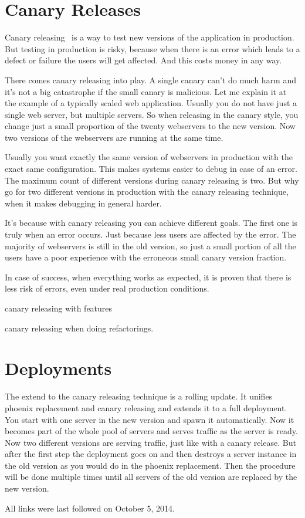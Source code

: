 \documentclass[runningheads,a4paper]{llncs}
\begin{document}
\section{Canary Releases}

Canary releasing~\cite[find page]{continuous_delivery} is a way to test new versions of the application in production. But testing in production is risky, because when there is an error which leads to a defect or failure the users will get affected. And this costs money in any way.

There comes canary releasing into play. A single canary can't do much harm and it's not a big catastrophe if the small canary is malicious. Let me explain it at the example of a typically scaled web application. Usually you do not have just a single web server, but multiple servers. So when releasing in the canary style, you change just a small proportion of the twenty webservers to the new version. Now two versions of the webservers are running at the same time.

Usually you want exactly the same version of webservers in production with the exact same configuration. This makes systems easier to debug in case of an error. The maximum count of different versions during canary releasing is two. But why go for two different versions in production with the canary releasing technique, when it makes debugging in general harder.

It's because with canary releasing you can achieve different goals. The first one is truly when an error occurs. Just because less users are affected by the error. The majority of webservers is still in the old version, so just a small portion of all the users have a poor experience with the erroneous small canary version fraction.

In case of success, when everything works as expected, it is proven that there is less risk of errors, even under real production conditions.

canary releasing with features

canary releasing when doing refactorings.

\section{Deployments}

The extend to the canary releasing technique is a rolling update. It unifies phoenix replacement and canary releasing and extends it to a full deployment. You start with one server in the new version and spawn it automatically. Now it becomes part of the whole pool of servers and serves traffic as the server is ready. Now two different versions are serving traffic, just like with a canary release. But after the first step the deployment goes on and then destroys a server instance in the old version as you would do in the phoenix replacement. Then the procedure will be done multiple times until all servers of the old version are replaced by the new version.




All links were last followed on October 5, 2014.
\end{document}
